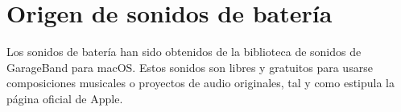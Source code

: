 
    \section{Origen de sonidos de batería} %
    \label{sec:OrigenDeSonidosDeBateria}

        Los sonidos de batería han sido obtenidos de la biblioteca de sonidos de GarageBand para macOS\cite{garageband}.
        Estos sonidos son libres y gratuitos para usarse composiciones musicales o proyectos de audio originales, tal y
        como estipula la página oficial de Apple\cite{support_garageband}.



\newpage

